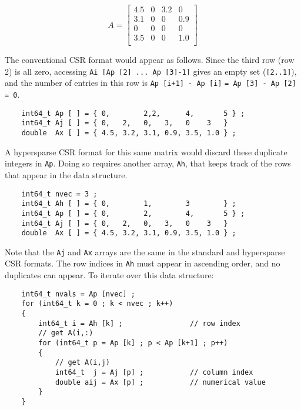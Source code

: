 \documentclass[12pt]{article}
\begin{document}
    \begin{equation}
    \label{eqn:Ahyper}
    A = \left[
    \begin{array}{cccc}
    4.5 &   0 & 3.2 &   0 \\
    3.1 &   0 &  0  & 0.9 \\
     0  &   0 &  0  &   0 \\
    3.5 &   0 &  0  & 1.0 \\
    \end{array}
    \right]
    \end{equation}

The conventional CSR format would appear as follows.  Since the third row (row
2) is all zero, accessing \verb'Ai [Ap [2] ... Ap [3]-1]' gives an empty set
(\verb'[2..1]'), and the number of entries in this row is
\verb'Ap [i+1] - Ap [i]' \verb'= Ap [3] - Ap [2] = 0'.

{\footnotesize
\begin{verbatim}
    int64_t Ap [ ] = { 0,        2,2,      4,       5 } ;
    int64_t Aj [ ] = { 0,   2,   0,   3,   0    3   }
    double  Ax [ ] = { 4.5, 3.2, 3.1, 0.9, 3.5, 1.0 } ; \end{verbatim} }

A hypersparse CSR format for this same matrix would discard
these duplicate integers in \verb'Ap'.  Doing so requires
another array, \verb'Ah', that keeps track of the rows that appear
in the data structure.

\newpage
{\footnotesize
\begin{verbatim}
    int64_t nvec = 3 ;
    int64_t Ah [ ] = { 0,        1,        3        } ;
    int64_t Ap [ ] = { 0,        2,        4,       5 } ;
    int64_t Aj [ ] = { 0,   2,   0,   3,   0    3   }
    double  Ax [ ] = { 4.5, 3.2, 3.1, 0.9, 3.5, 1.0 } ; \end{verbatim} }

Note that the \verb'Aj' and \verb'Ax' arrays are the same in the standard and
hypersparse CSR formats.  The row indices in \verb'Ah' must appear in ascending
order, and no duplicates can appear.  To iterate over this data structure:

    {\footnotesize
    \begin{verbatim}
    int64_t nvals = Ap [nvec] ;
    for (int64_t k = 0 ; k < nvec ; k++)
    {
        int64_t i = Ah [k] ;                // row index
        // get A(i,:)
        for (int64_t p = Ap [k] ; p < Ap [k+1] ; p++)
        {
            // get A(i,j)
            int64_t  j = Aj [p] ;           // column index
            double aij = Ax [p] ;           // numerical value
        }
    } \end{verbatim}}
\end{document}
